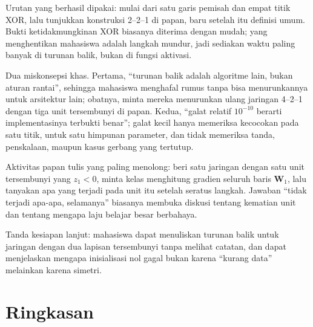 \begin{untukdosen}
Urutan yang berhasil dipakai: mulai dari satu garis pemisah dan empat titik XOR, lalu tunjukkan
konstruksi 2--2--1 di papan, baru setelah itu definisi umum. Bukti ketidakmungkinan XOR biasanya diterima dengan mudah; yang menghentikan mahasiswa adalah langkah mundur, jadi sediakan waktu paling banyak di turunan balik, bukan di fungsi aktivasi.

Dua miskonsepsi khas. Pertama, ``turunan balik adalah algoritme lain, bukan aturan rantai'',
sehingga mahasiswa menghafal rumus tanpa bisa menurunkannya untuk arsitektur lain; obatnya,
minta mereka menurunkan ulang jaringan 4--2--1 dengan tiga unit tersembunyi di papan. Kedua,
``galat relatif $10^{-10}$ berarti implementasinya terbukti benar''; galat kecil hanya
memeriksa kecocokan pada satu titik, untuk satu himpunan parameter, dan tidak memeriksa tanda,
penskalaan, maupun kasus gerbang yang tertutup.

Aktivitas papan tulis yang paling menolong: beri satu jaringan dengan satu unit tersembunyi
yang $z_{1}<0$, minta kelas menghitung gradien seluruh baris $\mathbf{W}_{1}$, lalu tanyakan
apa yang terjadi pada unit itu setelah seratus langkah. Jawaban ``tidak terjadi apa-apa,
selamanya'' biasanya membuka diskusi tentang kematian unit dan tentang mengapa laju belajar
besar berbahaya.

Tanda kesiapan lanjut: mahasiswa dapat menuliskan turunan balik untuk jaringan dengan dua
lapisan tersembunyi tanpa melihat catatan, dan dapat menjelaskan mengapa inisialisasi nol
gagal bukan karena ``kurang data'' melainkan karena simetri.
\end{untukdosen}

\section{Ringkasan}

